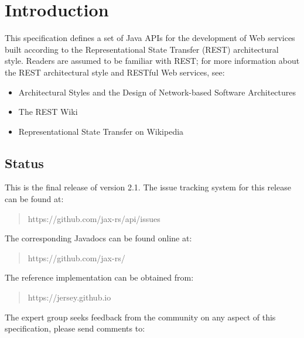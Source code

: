 \chapter{Introduction}

This specification defines a set of Java APIs for the development of Web services built according to the Representational State Transfer\cite{rest} (REST) architectural style. Readers are assumed to be familiar with 
REST; for more information about the REST architectural style and RESTful Web services, see:

\begin{itemize}
\item Architectural Styles and the Design of Network-based Software Architectures\cite{rest}
\item The REST Wiki\cite{restwiki}
\item Representational State Transfer on Wikipedia\cite{restwikipedia}
\end{itemize}

\section{Status}
\label{status}


This is the final release of version 2.1. The issue tracking system for this release can be found at:

\begin{quote}
https://github.com/jax-rs/api/issues
\end{quote}

The corresponding Javadocs can be found online at:

\begin{quote}
https://github.com/jax-rs/
\end{quote}

The reference implementation can be obtained from:

\begin{quote}
https://jersey.github.io
\end{quote}

The expert group seeks feedback from the community on any aspect of this specification, please send comments to:

